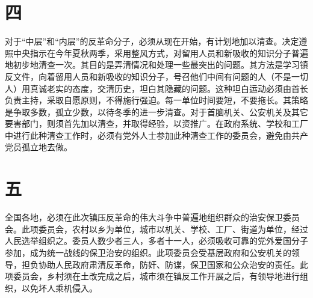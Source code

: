 \section*{四}

对于“中层”和“内层”的反革命分子，必须从现在开始，有计划地加以清查。决定遵照中央指示在今年夏秋两季，采用整风方式，对留用人员和新吸收的知识分子普遍地初步地清查一次。其目的是弄清情况和处理一些最突出的问题。其方法是学习镇反文件，向着留用人员和新吸收的知识分子，号召他们中间有问题的人（不是一切人）用真诚老实的态度，交清历史，坦白其隐藏的问题。这种坦白运动必须由首长负责主持，采取自愿原则，不得施行强迫。每一单位时间要短，不要拖长。其策略是争取多数，孤立少数，以待冬季的进一步清查。对于首脑机关、公安机关及其它要害部门，则须首先加以清查，并取得经验，以资推广。在政府系统、学校和工厂中进行此种清查工作时，必须有党外人士参加此种清查工作的委员会，避免由共产党员孤立地去做。

\section*{五}

全国各地，必须在此次镇压反革命的伟大斗争中普遍地组织群众的治安保卫委员会。此项委员会，农村以乡为单位，城市以机关、学校、工厂、街道为单位，经过人民选举组织之。委员人数少者三人，多者十一人，必须吸收可靠的党外爱国分子参加，成为统一战线的保卫治安的组织。此项委员会受基层政府和公安机关的领导，担负协助人民政府肃清反革命，防奸、防谍，保卫国家和公众治安的责任。此项委员会，乡村须在土改完成之后，城市须在镇反工作开展之后，有领导地进行组织，以免坏人乘机侵入。
